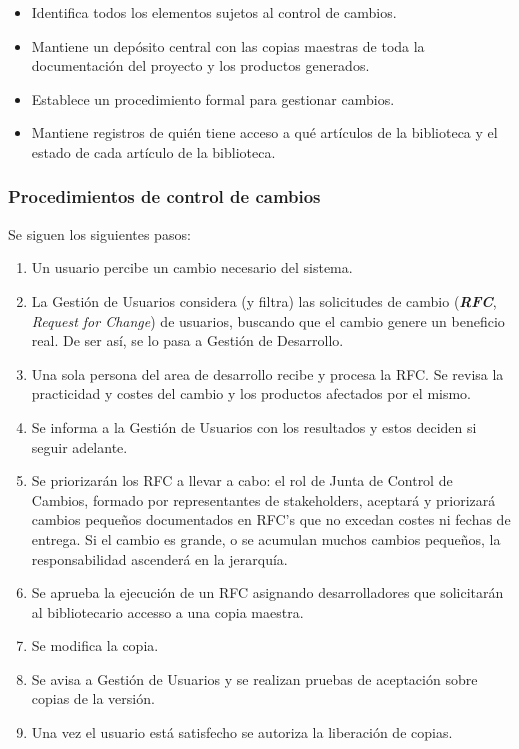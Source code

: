 \documentclass[12pt]{article}
\begin{document}
\begin{itemize}
    \item {Identifica todos los elementos sujetos al control de cambios.}
    \item {Mantiene un depósito central con las copias maestras de toda la documentación del proyecto y los productos generados.}
    \item {Establece un procedimiento formal para gestionar cambios.}
    \item {Mantiene registros de quién tiene acceso a qué artículos de la biblioteca y el estado de cada artículo de la biblioteca.}
\end{itemize}

\subsubsection{Procedimientos de control de cambios}
\label{9.9.2}

{Se siguen los siguientes pasos:}
\begin{enumerate}
    \item {Un usuario percibe un cambio necesario del sistema.}
    \item {La Gestión de Usuarios considera (y filtra) las solicitudes de cambio (\textbf{\textit{RFC}}, \textit{Request for Change}) de usuarios, buscando que el cambio genere un beneficio real. De ser así, se lo pasa a Gestión de Desarrollo.}
    \item {Una sola persona del area de desarrollo recibe y procesa la RFC. Se revisa la practicidad y costes del cambio y los productos afectados por el mismo.}
    \item {Se informa a la Gestión de Usuarios con los resultados y estos deciden si seguir adelante.}
    \item {Se priorizarán los RFC a llevar a cabo: el rol de Junta de Control de Cambios, formado por representantes de stakeholders, aceptará y priorizará cambios pequeños documentados en RFC's que no excedan costes ni fechas de entrega. Si el cambio es grande, o se acumulan muchos cambios pequeños, la responsabilidad ascenderá en la jerarquía.}
    \item {Se aprueba la ejecución de un RFC asignando desarrolladores que solicitarán al bibliotecario accesso a una copia maestra.}
    \item {Se modifica la copia.}
    \item {Se avisa a Gestión de Usuarios y se realizan pruebas de aceptación sobre copias de la versión.}
    \item {Una vez el usuario está satisfecho se autoriza la liberación de copias.}
\end{enumerate}
\end{document}
